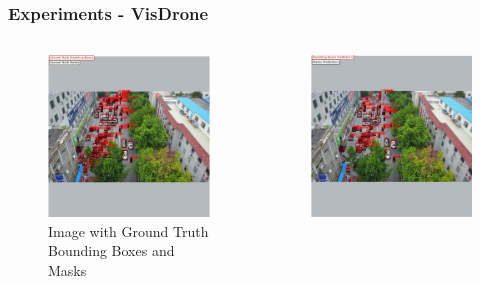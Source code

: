 \documentclass{beamer}
\begin{document}
\begin{frame}[t]
  \scriptsize
  \frametitle{Experiments - VisDrone}
  \begin{columns}
      \begin{column}{0.5\textwidth}
      \centering
      \begin{figure}
        \includegraphics[scale=0.22]{Figures/vis_ground_truth.jpg}
        \caption{Image with Ground Truth Bounding Boxes and Masks}
        \label{fig:pre-process}
      \end{figure}
    \end{column}
    \begin{column}{0.5\textwidth}
      \centering
      \begin{figure}
        \includegraphics[scale=0.22]{Figures/vis_predictions.jpg}

\end{figure}
\end{column}
\end{columns}
\end{frame}
\end{document}
